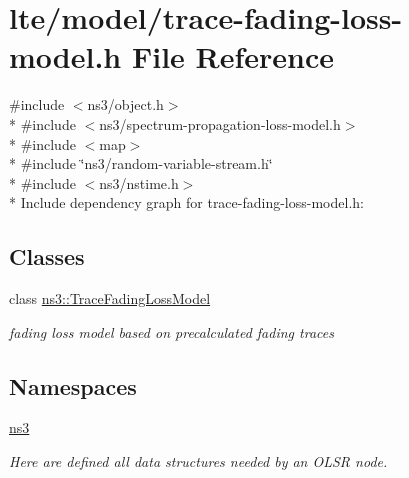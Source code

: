 \hypertarget{lte_2model_2trace-fading-loss-model_8h}{}\section{lte/model/trace-\/fading-\/loss-\/model.h File Reference}
\label{lte_2model_2trace-fading-loss-model_8h}
{\ttfamily \#include $<$ns3/object.\+h$>$}\\*
{\ttfamily \#include $<$ns3/spectrum-\/propagation-\/loss-\/model.\+h$>$}\\*
{\ttfamily \#include $<$map$>$}\\*
{\ttfamily \#include \char`\"{}ns3/random-\/variable-\/stream.\+h\char`\"{}}\\*
{\ttfamily \#include $<$ns3/nstime.\+h$>$}\\*
Include dependency graph for trace-\/fading-\/loss-\/model.h\+:
\subsection*{Classes}
\begin{DoxyCompactItemize}
\item 
class \hyperlink{classns3_1_1TraceFadingLossModel}{ns3\+::\+Trace\+Fading\+Loss\+Model}
\begin{DoxyCompactList}\small\item\em fading loss model based on precalculated fading traces \end{DoxyCompactList}\end{DoxyCompactItemize}
\subsection*{Namespaces}
\begin{DoxyCompactItemize}
\item 
 \hyperlink{namespacens3}{ns3}
\begin{DoxyCompactList}\small\item\em Here are defined all data structures needed by an O\+L\+SR node. \end{DoxyCompactList}\end{DoxyCompactItemize}
